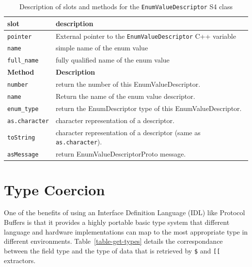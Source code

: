 \documentclass[article]{jss}
\begin{document}
\begin{table}[h]
\centering
\begin{small}
\begin{tabular}{l|p{10cm}}
\hline
\textbf{slot} & \textbf{description} \\
\hline
\texttt{pointer} & External pointer to the \texttt{EnumValueDescriptor} C++ variable \\
\hline
\texttt{name} & simple name of the enum value \\
\hline
\texttt{full\_name} & fully qualified name of the enum value \\[.3cm]
\hline
\textbf{Method} & \textbf{Description} \\
\hline
\texttt{number} & return the number of this EnumValueDescriptor. \\
\texttt{name} & Return the name of the enum value descriptor.\\
\texttt{enum\_type} & return the EnumDescriptor type of this EnumValueDescriptor. \\
\texttt{as.character} & character representation of a descriptor. \\
\texttt{toString} & character representation of a descriptor (same as \texttt{as.character}). \\
\texttt{asMessage} & return EnumValueDescriptorProto message. \\
\hline
\end{tabular}
\end{small}
\caption{\label{EnumValueDescriptor-methods-table}Description of slots
  and methods for the \texttt{EnumValueDescriptor} S4 class}
\end{table}

\section{Type Coercion}

One of the benefits of using an Interface Definition Language (IDL)
like Protocol Buffers is that it provides a highly portable basic type
system that different language and hardware implementations can map to
the most appropriate type in different environments.
Table~\ref{table-get-types} details the correspondance between the
field type and the type of data that is retrieved by \verb|$| and \verb|[[|
extractors.
\end{document}
